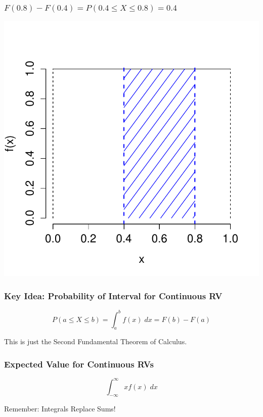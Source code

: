 \documentclass[handout]{beamer}
\begin{document}
\begin{frame}
\frametitle{$F(0.8) - F(0.4) = P(0.4 \leq X \leq 0.8) = 0.4$}
\centering
	\includegraphics[scale = 0.6]{./images/uniform_density_interval}


\end{frame}
\begin{frame}
\frametitle{Key Idea: Probability of Interval for Continuous RV}

$$\boxed{P(a\leq X \leq b) = \int_a^b f(x) \; dx = F(b) - F(a)}$$

\vspace{2em}
\alert{This is just the Second Fundamental Theorem of Calculus.}
\end{frame}

\begin{frame}
\frametitle{Expected Value for Continuous RVs}
$$\boxed{\int_{-\infty}^\infty x f(x) \; dx  }$$

\vspace{2em}
\alert{Remember: Integrals Replace Sums!}
\end{frame}
\end{document}
